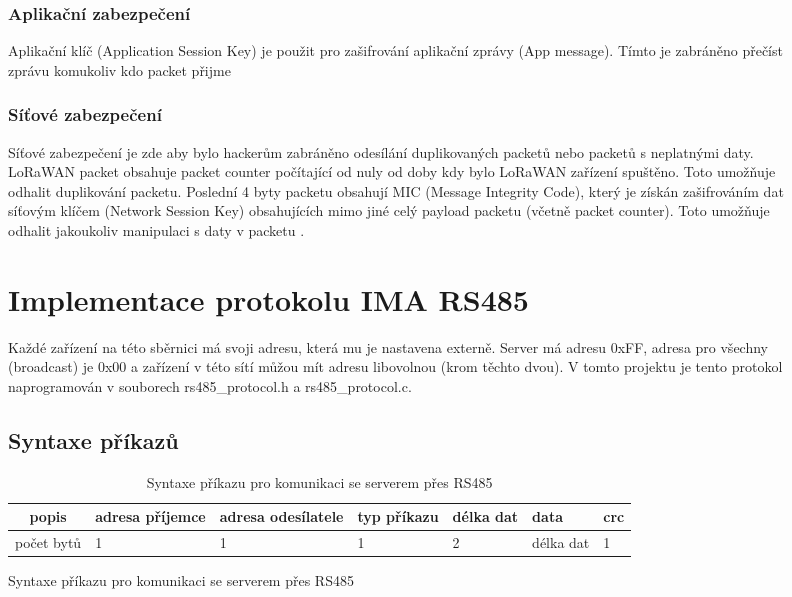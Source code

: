 \begin{figure}[!h]
\subsubsection{Aplikační zabezpečení}
Aplikační klíč (Application Session Key) je použit pro zašifrování aplikační zprávy (App message). Tímto je zabráněno přečíst zprávu komukoliv kdo packet přijme 


\subsubsection{Síťové zabezpečení}
Síťové zabezpečení je zde aby bylo hackerům zabráněno odesílání duplikovaných packetů nebo packetů s neplatnými daty.
LoRaWAN packet obsahuje packet counter počítající od nuly od doby kdy bylo LoRaWAN zařízení spuštěno. Toto umožňuje odhalit duplikování packetu.
Poslední 4 byty packetu obsahují MIC (Message Integrity Code), který je získán zašifrováním dat síťovým klíčem (Network Session Key) obsahujících mimo jiné celý payload packetu (včetně packet counter). Toto umožňuje odhalit jakoukoliv manipulaci s daty v packetu \cite{lwSpec} \cite{lwSecur}.



\section{Implementace protokolu IMA RS485}
Každé zařízení na této sběrnici má svoji adresu, která mu je nastavena externě. Server má adresu  0xFF, adresa pro všechny (broadcast) je 0x00 a zařízení v této sítí můžou mít adresu libovolnou (krom těchto dvou). V tomto projektu je tento protokol naprogramován v souborech rs485\_protocol.h a rs485\_protocol.c.

\subsection{Syntaxe příkazů}

\begin{table}[!h]
    \centering
\begin{tabular}{ |c|| p{1.5cm} | p{1.5cm} | p{1cm} | p{1cm} | p{1cm} | p{1cm} | }
 \hline
 popis      & adresa příjemce & adresa odesílatele & typ příkazu & délka dat & data & crc\\ \hline
 počet bytů & 1               & 1   & 1     & 2     & délka dat     & 1 \\ 
 \hline
\end{tabular}
    \caption{Syntaxe příkazu pro komunikaci se serverem přes RS485}
    \label{table:1}
\end{table}


\end{figure}
